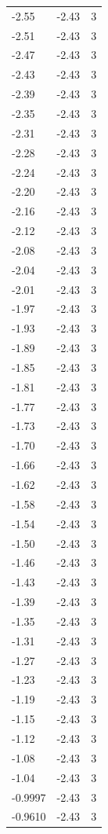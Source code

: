 \begin{longtable}{lrr}
  -2.55 & -2.43 & 3 \\
  -2.51 & -2.43 & 3 \\
  -2.47 & -2.43 & 3 \\
  -2.43 & -2.43 & 3 \\
  -2.39 & -2.43 & 3 \\
  -2.35 & -2.43 & 3 \\
  -2.31 & -2.43 & 3 \\
  -2.28 & -2.43 & 3 \\
  -2.24 & -2.43 & 3 \\
  -2.20 & -2.43 & 3 \\
  -2.16 & -2.43 & 3 \\
  -2.12 & -2.43 & 3 \\
  -2.08 & -2.43 & 3 \\
  -2.04 & -2.43 & 3 \\
  -2.01 & -2.43 & 3 \\
  -1.97 & -2.43 & 3 \\
  -1.93 & -2.43 & 3 \\
  -1.89 & -2.43 & 3 \\
  -1.85 & -2.43 & 3 \\
  -1.81 & -2.43 & 3 \\
  -1.77 & -2.43 & 3 \\
  -1.73 & -2.43 & 3 \\
  -1.70 & -2.43 & 3 \\
  -1.66 & -2.43 & 3 \\
  -1.62 & -2.43 & 3 \\
  -1.58 & -2.43 & 3 \\
  -1.54 & -2.43 & 3 \\
  -1.50 & -2.43 & 3 \\
  -1.46 & -2.43 & 3 \\
  -1.43 & -2.43 & 3 \\
  -1.39 & -2.43 & 3 \\
  -1.35 & -2.43 & 3 \\
  -1.31 & -2.43 & 3 \\
  -1.27 & -2.43 & 3 \\
  -1.23 & -2.43 & 3 \\
  -1.19 & -2.43 & 3 \\
  -1.15 & -2.43 & 3 \\
  -1.12 & -2.43 & 3 \\
  -1.08 & -2.43 & 3 \\
  -1.04 & -2.43 & 3 \\
  -0.9997 & -2.43 & 3 \\
  -0.9610 & -2.43 & 3 \\

\end{longtable}
